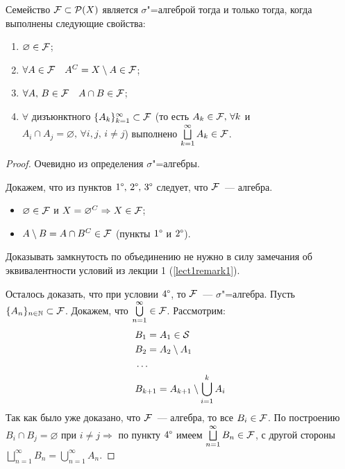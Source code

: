\begin{claim}[Критерий $\sigma$"=алгебры]
    Семейство $\mathcal{F} \subset \mathcal{P}(X)$ является $\sigma$"=алгеброй тогда и только тогда, когда выполнены следующие свойства: 
    \begin{enumerate}[label=\arabic*\degree.]
        \item $\varnothing\in\mathcal{F} $;
        \item $\forall A\in\mathcal{F}  \quad A^C=X\setminus A\in\mathcal{F} $;
        \item $\forall A,\, B\in\mathcal{F} \quad A\cap B\in\mathcal{F} $;
        \item $\forall$ дизъюнктного $\{A_k\}_{k=1}^{\infty}\subset \mathcal{F} $ (то есть $A_k\in\mathcal{F} , \, \forall k$ и
        $A_i\cap A_j=\varnothing,\, \forall i,j,\, i\neq j$) выполнено $\bigsqcup\limits_{k=1}^{\infty}A_k\in\mathcal{F} $.
    \end{enumerate}

    \begin{proof}
        \circled{$\Rightarrow$} Очевидно из определения $\sigma$"=алгебры.

        \circled{$\Leftarrow$} Докажем, что из пунктов $1\degree, \, 2\degree,\, 3\degree$ следует, что $\mathcal{F} $~--- алгебра.
        \begin{itemize}
            \item $\varnothing\in\mathcal{F} $ и $X = \varnothing^C\Rightarrow X\in\mathcal{F} $;
            \item $A\setminus B = A\cap B^C\in\mathcal{F} $ (пункты $1\degree$ и $2\degree$).
        \end{itemize}
        \begin{remark}
            Доказывать замкнутость по объединению не нужно в силу замечания об эквивалентности условий из лекции 1 (\ref{lect1remark1}).
        \end{remark}

        Осталось доказать, что при условии $4\degree$, то $\mathcal{F} $~--- $\sigma$"=алгебра. Пусть 
        $\{A_n\}_{n\in\mathbb{N}}\subset \mathcal{F} $. Докажем, что $\bigcup\limits_{n=1}^{\infty}\in\mathcal{F} $.
        Рассмотрим:
        \begin{align*}
            &B_1 = A_1\in\mathcal{S}\\
            &B_2 = A_2\setminus A_1\\
            &\ldots\\
            &B_{k+1}=A_{k+1}\setminus\bigcup_{i=1}^k A_i
        \end{align*}
        Так как было уже доказано, что $\mathcal{F} $~--- алгебра, то все $B_i\in\mathcal{F} $. По построению $B_i\cap B_j=\varnothing$ при
        $i\neq j\Rightarrow$ по пункту $4\degree$ имеем $\bigsqcup\limits_{n=1}^{\infty}B_n\in\mathcal{F} $, с другой стороны 
        $\bigsqcup\limits_{n=1}^{\infty}B_n = \bigcup\limits_{n=1}^{\infty}A_n$.

    \end{proof}
\end{claim}

